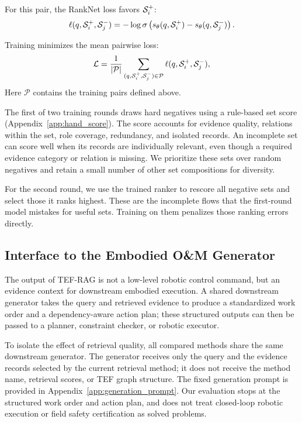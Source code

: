 For this pair, the RankNet loss favors $\mathcal{S}_i^+$:
\begin{equation}
\ell(q,\mathcal{S}_i^+,\mathcal{S}_j^-)
=
-\log \sigma\left(
s_{\theta}(q,\mathcal{S}_i^+)
-
s_{\theta}(q,\mathcal{S}_j^-)
\right).
\label{eq:ranknet_pair_loss}
\end{equation}

Training minimizes the mean pairwise loss:
\begin{equation}
\mathcal{L}
=
\frac{1}{|\mathcal{P}|}
\sum_{(q,\mathcal{S}_i^+,\mathcal{S}_j^-)\in\mathcal{P}}
\ell(q,\mathcal{S}_i^+,\mathcal{S}_j^-),
\label{eq:ranknet_loss}
\end{equation}
Here $\mathcal{P}$ contains the training pairs defined above.

The first of two training rounds draws hard negatives using a rule-based set score (Appendix~\ref{app:hand_score}). The score accounts for evidence quality, relations within the set, role coverage, redundancy, and isolated records. An incomplete set can score well when its records are individually relevant, even though a required evidence category or relation is missing. We prioritize these sets over random negatives and retain a small number of other set compositions for diversity.

For the second round, we use the trained ranker to rescore all negative sets and select those it ranks highest. These are the incomplete flows that the first-round model mistakes for useful sets. Training on them penalizes those ranking errors directly.

\subsection{Interface to the Embodied O\&M Generator}

The output of TEF-RAG is not a low-level robotic control command, but an evidence context for downstream embodied execution. A shared downstream generator takes the query and retrieved evidence to produce a standardized work order and a dependency-aware action plan; these structured outputs can then be passed to a planner, constraint checker, or robotic executor.

To isolate the effect of retrieval quality, all compared methods share the same downstream generator. The generator receives only the query and the evidence records selected by the current retrieval method; it does not receive the method name, retrieval scores, or TEF graph structure. The fixed generation prompt is provided in Appendix~\ref{app:generation_prompt}. Our evaluation stops at the structured work order and action plan, and does not treat closed-loop robotic execution or field safety certification as solved problems.